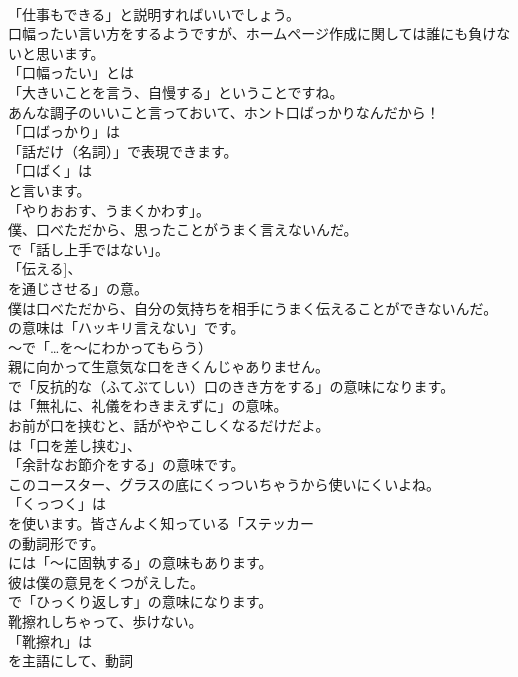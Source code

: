 \documentclass[8pt]{extreport}
\begin{document}
\begin{CJK}{UTF8}{min}
\\	「仕事もできる」と説明すればいいでしょう。	
\\	口幅ったい言い方をするようですが、ホームページ作成に関しては誰にも負けないと思います。 
\\	「口幅ったい」とは
\\	「大きいことを言う、自慢する」ということですね。	
\\	あんな調子のいいこと言っておいて、ホント口ばっかりなんだから！ 
\\	「口ばっかり」は
\\	「話だけ（名詞）」で表現できます。	
\\	「口ばく」は
\\	と言います。
\\	「やりおおす、うまくかわす」。	
\\	僕、口べただから、思ったことがうまく言えないんだ。 
\\	で「話し上手ではない」。
\\	「伝える]、
\\	を通じさせる」の意。	
\\	僕は口べただから、自分の気持ちを相手にうまく伝えることができないんだ。 
\\	の意味は「ハッキリ言えない」です。
\\	～で「…を～にわかってもらう）	
\\	親に向かって生意気な口をきくんじゃありません。 
\\	で「反抗的な（ふてぶてしい）口のきき方をする」の意味になります。
\\	は「無礼に、礼儀をわきまえずに」の意味。	
\\	お前が口を挟むと、話がややこしくなるだけだよ。 
\\	は「口を差し挟む」、
\\	「余計なお節介をする」の意味です。	
\\	このコースター、グラスの底にくっついちゃうから使いにくいよね。 
\\	「くっつく」は
\\	を使います。皆さんよく知っている「ステッカー
\\	の動詞形です。
\\	には「～に固執する」の意味もあります。	
\\	彼は僕の意見をくつがえした。 
\\	で「ひっくり返しす」の意味になります。	
\\	靴擦れしちゃって、歩けない。 
\\	「靴擦れ」は
\\	を主語にして、動詞

\end{CJK}
\end{document}

